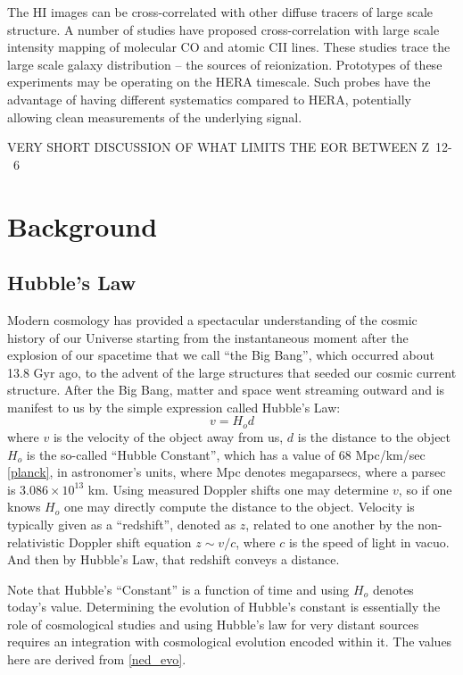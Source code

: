 \documentclass[ars]{/Users/daviddeboer1/Documents/Papers/Copernicus_LaTeX_Package_v_2_7/copernicus}
\begin{document}
The HI images can be cross-correlated with other diffuse tracers of large scale
structure. A number of studies have proposed cross-correlation with large scale
intensity mapping of molecular CO \cite{lidz_et_al2011} and atomic CII
\citep{gong_et_al2011} lines. These studies trace the large scale galaxy distribution
-- the sources of reionization. Prototypes of these experiments may be operating on
the HERA timescale. Such probes have the advantage of having different systematics
compared to HERA, potentially allowing clean measurements of the underlying signal.


VERY SHORT DISCUSSION OF WHAT LIMITS THE EOR BETWEEN Z~12-~6

\section{Background}
\label{sec:background}
\subsection{Hubble's Law}
\label{sec:hubble}
Modern cosmology has provided a spectacular understanding of the cosmic history of
our Universe starting from the instantaneous moment after the explosion of our
spacetime that we call ``the Big Bang'', which occurred about 13.8 Gyr ago, to the
advent of the large structures that seeded our cosmic current structure. After the
Big Bang, matter and space went streaming outward and is manifest to us by the simple
expression called Hubble's Law:
\begin{equation}
v = H_od
\end{equation}
where $v$ is the velocity of the object away from us, $d$ is the distance to the
object $H_o$ is the so-called ``Hubble Constant'', which has a value of 68 Mpc/km/sec
\ref{planck}, in astronomer's units, where Mpc denotes megaparsecs, where a parsec is
$3.086 \times 10^13$ km. Using measured Doppler shifts one may determine $v$, so if one
knows $H_o$ one may directly compute the distance to the object. Velocity is
typically given as a ``redshift'', denoted as $z$, related to one another by the
non-relativistic Doppler shift equation $z \sim v/c$, where $c$ is the speed of light
in vacuo. And then by Hubble's Law, that redshift conveys a distance.

Note that Hubble's ``Constant'' is a function of time and using $H_o$ denotes today's
value. Determining the evolution of Hubble's constant is essentially the role of
cosmological studies and using Hubble's law for very distant sources requires an
integration with cosmological evolution encoded within it. The values here are
derived from \ref{ned_evo}.
\end{document}
